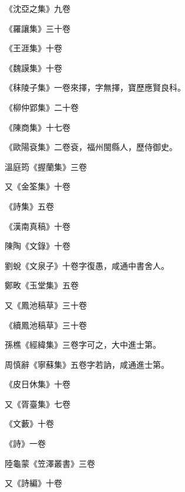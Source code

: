 \begin{pinyinscope}
 《沈亞之集》九卷



 《羅讓集》三十卷



 《王涯集》十卷



 《魏謨集》十卷



 《秣陵子集》一卷來擇，字無擇，寶歷應賢良科。



 《柳仲郢集》二十卷



 《陳商集》十七卷



 《歐陽袞集》二卷袞，福州閩縣人，歷侍御史。



 溫庭筠《握蘭集》三卷



 又《金筌集》十卷



 《詩集》五卷



 《漢南真稿》十卷



 陳陶《文錄》十卷



 劉蛻《文泉子》十卷字復愚，咸通中書舍人。



 鄭畋《玉堂集》五卷



 又《鳳池稿草》三十卷



 《續鳳池稿草》三十卷



 孫樵《經緯集》三卷字可之，大中進士第。



 周慎辭《寧蘇集》五卷字若訥，咸通進士第。



 《皮日休集》十卷



 又《胥臺集》七卷



 《文藪》十卷



 《詩》一卷



 陸龜蒙《笠澤叢書》三卷



 又《詩編》十卷




\end{pinyinscope}
